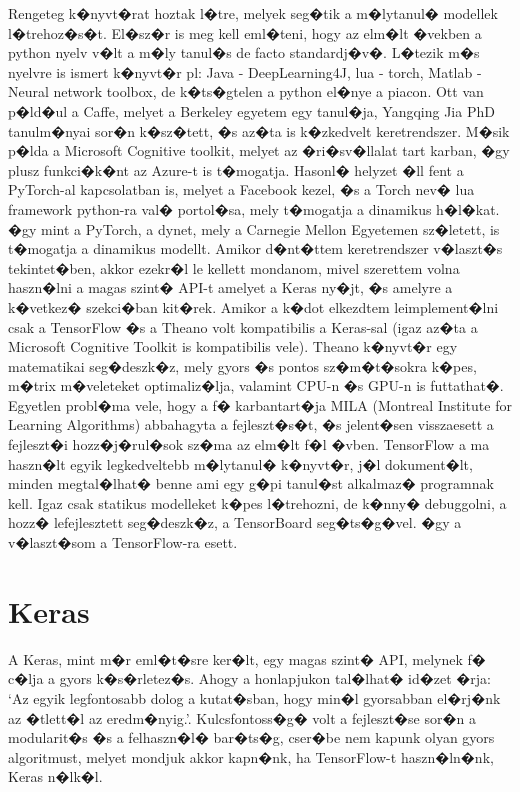 \documentclass[12pt]{report}
\theoremstyle{definition}
\begin{document}
Rengeteg k�nyvt�rat hoztak l�tre, melyek seg�tik a m�lytanul� modellek 
l�trehoz�s�t. El�sz�r is meg kell eml�teni, hogy az elm�lt �vekben a python 
nyelv v�lt a m�ly tanul�s de facto standardj�v�.
L�tezik m�s nyelvre is ismert k�nyvt�r pl: Java - DeepLearning4J, lua - torch, 
Matlab - Neural network toolbox, de k�ts�gtelen a python el�nye a piacon. 
Ott van p�ld�ul a Caffe, melyet a Berkeley egyetem egy tanul�ja, Yangqing Jia 
PhD tanulm�nyai sor�n k�sz�tett, �s az�ta is k�zkedvelt keretrendszer. M�sik 
p�lda a Microsoft Cognitive toolkit, melyet az �ri�sv�llalat tart karban, �gy 
plusz funkci�k�nt az Azure-t is t�mogatja. Hasonl� helyzet �ll fent a 
PyTorch-al kapcsolatban is, melyet a Facebook kezel, �s a Torch nev� lua 
framework python-ra val� portol�sa, mely t�mogatja a dinamikus h�l�kat. �gy 
mint a PyTorch, a dynet, mely a Carnegie Mellon Egyetemen sz�letett, is 
t�mogatja a dinamikus modellt.
Amikor d�nt�ttem keretrendszer v�laszt�s tekintet�ben, akkor ezekr�l le kellett 
mondanom, mivel szerettem volna haszn�lni a magas szint� API-t amelyet a Keras 
ny�jt, �s amelyre a k�vetkez� szekci�ban kit�rek. Amikor a k�dot elkezdtem 
leimplement�lni csak a TensorFlow �s a Theano volt kompatibilis a Keras-sal 
(igaz az�ta a Microsoft Cognitive Toolkit is kompatibilis vele).
Theano k�nyvt�r egy matematikai seg�deszk�z, mely gyors �s pontos sz�m�t�sokra 
k�pes, m�trix m�veleteket optimaliz�lja, valamint CPU-n �s GPU-n is futtathat�. 
Egyetlen probl�ma vele, hogy a f� karbantart�ja MILA (Montreal Institute for 
Learning Algorithms) abbahagyta a fejleszt�s�t, �s jelent�sen visszaesett a 
fejleszt�i hozz�j�rul�sok sz�ma az elm�lt f�l �vben.
TensorFlow a ma haszn�lt egyik legkedveltebb m�lytanul� k�nyvt�r, j�l 
dokument�lt, minden megtal�lhat� benne ami egy g�pi tanul�st alkalmaz� 
programnak kell. Igaz csak statikus modelleket k�pes l�trehozni, de k�nny� 
debuggolni, a hozz� lefejlesztett seg�deszk�z, a TensorBoard seg�ts�g�vel. �gy 
a v�laszt�som a TensorFlow-ra esett.

\section{Keras}
\label{keras}
A Keras, mint m�r eml�t�sre ker�lt, egy magas szint� API, melynek f� c�lja a gyors k�s�rletez�s. Ahogy a honlapjukon tal�lhat� id�zet �rja: `Az egyik legfontosabb dolog a kutat�sban, hogy min�l gyorsabban el�rj�nk az �tlett�l az eredm�nyig.'. Kulcsfontoss�g� volt a fejleszt�se sor�n a modularit�s �s a felhaszn�l� bar�ts�g, cser�be nem kapunk olyan gyors algoritmust, melyet mondjuk akkor kapn�nk, ha TensorFlow-t haszn�ln�nk, Keras n�lk�l.
\end{document}
